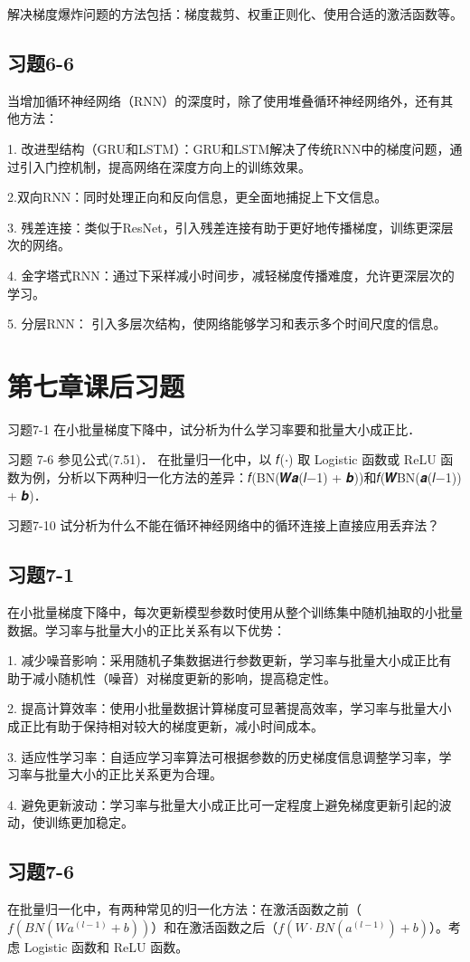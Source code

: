 \documentclass[]{article}
\begin{document}
解决梯度爆炸问题的方法包括：梯度裁剪、权重正则化、使用合适的激活函数等。
\subsection{习题6-6}
当增加循环神经网络（RNN）的深度时，除了使用堆叠循环神经网络外，还有其他方法：

1. 改进型结构（GRU和LSTM）：GRU和LSTM解决了传统RNN中的梯度问题，通过引入门控机制，提高网络在深度方向上的训练效果。

2.双向RNN：同时处理正向和反向信息，更全面地捕捉上下文信息。

3. 残差连接：类似于ResNet，引入残差连接有助于更好地传播梯度，训练更深层次的网络。

4. 金字塔式RNN：通过下采样减小时间步，减轻梯度传播难度，允许更深层次的学习。

5. 分层RNN：
引入多层次结构，使网络能够学习和表示多个时间尺度的信息。


\section{第七章课后习题}
习题7-1 在小批量梯度下降中，试分析为什么学习率要和批量大小成正比．

习题 7-6 参见公式(7.51)． 在批量归一化中，以 𝑓(⋅) 取 Logistic 函数或 ReLU 函数为例，分析以下两种归一化方法的差异：𝑓(BN(𝑾𝒂(𝑙−1) + 𝒃))和𝑓(𝑾BN(𝒂(𝑙−1)) + 𝒃)．

习题7-10 试分析为什么不能在循环神经网络中的循环连接上直接应用丢弃法？
\subsection{习题7-1}在小批量梯度下降中，每次更新模型参数时使用从整个训练集中随机抽取的小批量数据。学习率与批量大小的正比关系有以下优势：

1. 减少噪音影响：采用随机子集数据进行参数更新，学习率与批量大小成正比有助于减小随机性（噪音）对梯度更新的影响，提高稳定性。

2. 提高计算效率：使用小批量数据计算梯度可显著提高效率，学习率与批量大小成正比有助于保持相对较大的梯度更新，减小时间成本。

3. 适应性学习率：自适应学习率算法可根据参数的历史梯度信息调整学习率，学习率与批量大小的正比关系更为合理。

4. 避免更新波动：学习率与批量大小成正比可一定程度上避免梯度更新引起的波动，使训练更加稳定。

\subsection{习题7-6}
在批量归一化中，有两种常见的归一化方法：在激活函数之前（\(f(BN(Wa^{(l-1)} + b))\)）和在激活函数之后（\(f(W \cdot BN(a^{(l-1)}) + b)\)）。考虑 Logistic 函数和 ReLU 函数。
\end{document}
